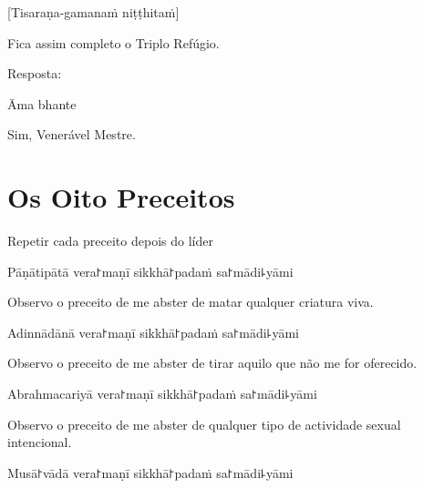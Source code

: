 [Tisaraṇa-gamanaṁ niṭṭhitaṁ]

\begin{english}
  Fica assim completo o Triplo Refúgio.
\end{english}

\begin{instruction}
  Resposta:
\end{instruction}

Āma bhante

\begin{english}
  Sim, Venerável Mestre.
\end{english}

\chapter{Os Oito Preceitos}

\begin{instruction}
  Repetir cada preceito depois do líder
\end{instruction}

\begin{precept}
  \setcounter{enumi}{0}
  \item Pāṇātipātā vera꜓maṇī sikkhā꜓padaṁ sa꜓mādi꜕yāmi
\end{precept}

\begin{english}
  Observo o preceito de me abster de matar qualquer criatura viva.
\end{english}

\begin{precept}
  \setcounter{enumi}{1}
  \item Adinnādānā vera꜓maṇī sikkhā꜓padaṁ sa꜓mādi꜕yāmi
\end{precept}

\begin{english}
  Observo o preceito de me abster de tirar aquilo que não me for oferecido.
\end{english}

\begin{precept}
  \setcounter{enumi}{2}
  \item Abrahmacariyā vera꜓maṇī sikkhā꜓padaṁ sa꜓mādi꜕yāmi
\end{precept}

\begin{english}
  Observo o preceito de me abster de qualquer tipo de actividade sexual intencional.
\end{english}

\begin{precept}
  \setcounter{enumi}{3}
  \item Musā꜓vādā vera꜓maṇī sikkhā꜓padaṁ sa꜓mādi꜕yāmi
\end{precept}

